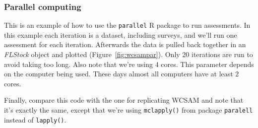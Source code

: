 \documentclass[a4paper,english,10pt]{article}\usepackage[]{graphicx}\usepackage[]{color}
\makeatletter
\newenvironment{kframe}{%
 \def\at@end@of@kframe{}%
 \ifinner\ifhmode%
  \def\at@end@of@kframe{\end{minipage}}%
  \begin{minipage}{\columnwidth}%
 \fi\fi%
 \def\FrameCommand##1{\hskip\@totalleftmargin \hskip-\fboxsep
 \colorbox{shadecolor}{##1}\hskip-\fboxsep
     \hskip-\linewidth \hskip-\@totalleftmargin \hskip\columnwidth}%
 \MakeFramed {\advance\hsize-\width
   \@totalleftmargin\z@ \linewidth\hsize
   \@setminipage}}%
 {\par\unskip\endMakeFramed%
 \at@end@of@kframe}
\newenvironment{knitrout}{}{} %
\newcommand{\code}[1]{{\texttt{#1}}}
\newcommand{\pkg}[1]{{\texttt{#1}}}
\newcommand{\class}[1]{{\textit{#1}}}
\makeatother
\begin{document}
\begin{knitrout}
\color{fgcolor}\begin{kframe}


{\ttfamily\noindent\bfseries{}}\end{kframe}
\end{knitrout}

\subsubsection{Parallel computing}

This is an example of how to use the \pkg{parallel} R package to run assessments. In this example each iteration is a dataset, including surveys, and we'll run one assessment for each iteration. Afterwards the data is pulled back together in an \class{FLStock} object and plotted (Figure~\ref{fig:wcsampar}). Only 20 iterations are run to avoid taking too long. Also note that we're using 4 cores. This parameter depends on the computer being used. These days almost all computers have at least 2 cores.

Finally, compare this code with the one for replicating WCSAM and note that it's exactly the same, except that we're using \code{mclapply()} from package \pkg{paralell} instead of \code{lapply()}.
\end{document}

